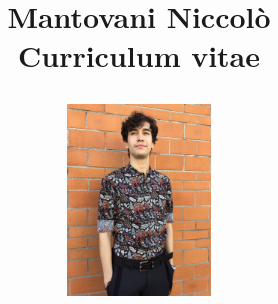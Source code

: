 \documentclass[a4paper,11pt]{article}
\begin{document}
	\title{
	
		\hspace{5mm}
		\begin{minipage}[b]{0.4\textwidth}
			Mantovani Niccolò \\
			\large Curriculum vitae
		\end{minipage}
		\hfill
		\hfill
		\begin{minipage}[b]{0.4\textwidth}
			\includegraphics[width=1.5in]{src/img/profile.jpg}     
		\end{minipage}

		\vspace{5mm}
		}
	\date{}
	\maketitle
	
	
	\vspace{1mm}
	
	\vspace{1mm}
	
	\newpage
	
	\vspace{1mm}
	
	\vspace{1mm}
	
\end{document}
